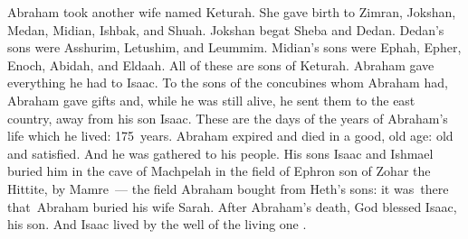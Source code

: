 
\begin{inparaenum}
     Abraham took another wife named Keturah.%
     She gave birth to Zimran, Jokshan, Medan, Midian, Ishbak, and Shuah.%
     Jokshan begat Sheba and Dedan. Dedan's sons were Asshurim, Letushim, and Leummim.%
     Midian's sons were Ephah, Epher, Enoch, Abidah, and Eldaah. All of these are sons of Keturah.%
     Abraham gave everything he had to Isaac.%
     To the sons of the concubines whom Abraham had, Abraham gave gifts and, while he was still alive, he sent them to the east country, away from his son Isaac.%
     These are the days of the years of Abraham's life which he lived: 175~years.%
     Abraham expired and died in a good, old age: old and satisfied. And he was gathered to his people.%
     His sons Isaac and Ishmael buried him in the cave of Machpelah in the field of Ephron son of Zohar the Hittite, by Mamre~---%
     the field Abraham bought from Heth's sons: it was\understood\ there that\understood\ Abraham buried his wife Sarah.%
     After Abraham's death, God blessed Isaac, his son. And Isaac lived by the well of the living one .%
    

\end{inparaenum}
